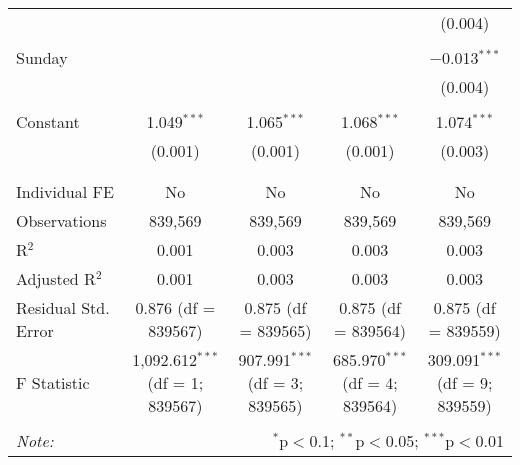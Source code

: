 \documentclass[
]{article}
\begin{document}
\begin{table}[!htbp]
{\begin{tabular}{@{\extracolsep{5pt}}lcccc}
  &  &  &  & (0.004) \\ 
  & & & & \\ 
 Sunday &  &  &  & $-$0.013$^{***}$ \\ 
  &  &  &  & (0.004) \\ 
  & & & & \\ 
 Constant & 1.049$^{***}$ & 1.065$^{***}$ & 1.068$^{***}$ & 1.074$^{***}$ \\ 
  & (0.001) & (0.001) & (0.001) & (0.003) \\ 
  & & & & \\ 
\hline \\[-1.8ex] 
Individual FE & No & No & No & No \\ 
Observations & 839,569 & 839,569 & 839,569 & 839,569 \\ 
R$^{2}$ & 0.001 & 0.003 & 0.003 & 0.003 \\ 
Adjusted R$^{2}$ & 0.001 & 0.003 & 0.003 & 0.003 \\ 
Residual Std. Error & 0.876 (df = 839567) & 0.875 (df = 839565) & 0.875 (df = 839564) & 0.875 (df = 839559) \\ 
F Statistic & 1,092.612$^{***}$ (df = 1; 839567) & 907.991$^{***}$ (df = 3; 839565) & 685.970$^{***}$ (df = 4; 839564) & 309.091$^{***}$ (df = 9; 839559) \\ 
\hline 
\hline \\[-1.8ex] 
\textit{Note:}  & \multicolumn{4}{r}{$^{*}$p$<$0.1; $^{**}$p$<$0.05; $^{***}$p$<$0.01} \\ 
\end{tabular}
} 
\end{table} 
\newpage
\end{document}
